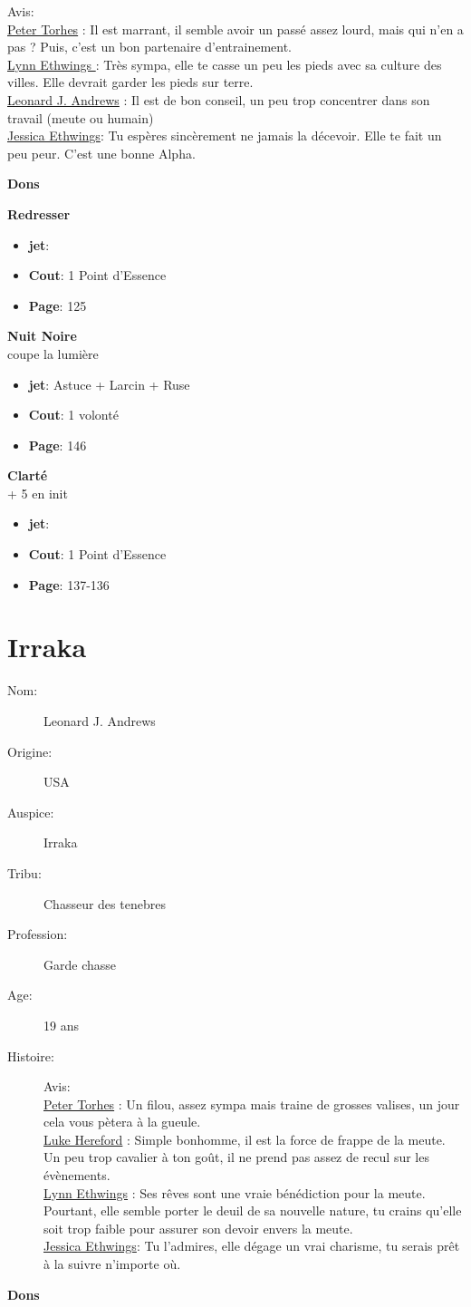 \documentclass[oneside,12pt]{book}
\newcommand\don[5]{
\textbf{#1} \\
#2
\begin{itemize}
\item{ \textbf{jet}: #3}
\item{ \textbf{Cout}: #4}
\item{ \textbf{Page}: #5}
\end{itemize}
\vspace{0.5cm}
}
\begin{document}
\begin{flushleft}
\begin{description}
{Avis:\\
\underline{Peter Torhes} : Il est marrant, il semble avoir un passé assez lourd, mais qui n'en a pas ? Puis, c'est un bon partenaire d'entrainement. \\
\underline{Lynn Ethwings }: Très sympa, elle te casse un peu les pieds avec sa culture des villes. Elle devrait garder les pieds sur terre.\\
\underline{Leonard J. Andrews} : Il est de bon conseil, un peu trop concentrer dans son travail (meute ou humain)\\
\underline{Jessica Ethwings}: Tu espères sincèrement ne jamais la décevoir. Elle te fait un peu peur. C'est une bonne Alpha.\\
}
\end{description}
\clearpage
\textbf{\large Dons} 
\vspace{0.5cm}


\don{Redresser}{}{}{1 Point d'Essence}{125}
\don{Nuit Noire}{coupe la lumière }{Astuce + Larcin + Ruse}{1 volonté}{146}
\don{Clarté}{+ 5 en init}{}{1 Point d'Essence}{137-136}

\clearpage
\section{Irraka}
\begin{description}
\item[Nom:]{Leonard J. Andrews}
\item[Origine:]{USA}
\item[Auspice:]{Irraka}
\item[Tribu:]{Chasseur des tenebres}
\item[Profession:]{Garde chasse}
\item[Age:]{19 ans}
\item[Histoire:]{
Avis:\\
\underline{Peter Torhes} : Un filou, assez sympa mais traine de grosses valises, un jour cela vous pètera à la gueule.\\
\underline{Luke Hereford} : Simple bonhomme, il est la force de frappe de la meute. Un peu trop cavalier à ton goût, il ne prend pas assez de recul sur les évènements.\\
\underline{Lynn Ethwings}  : Ses rêves sont une vraie bénédiction pour la meute. Pourtant, elle semble porter le deuil de sa nouvelle nature, tu crains qu'elle soit trop faible pour assurer son devoir envers la meute.\\
\underline{Jessica  Ethwings}: Tu l'admires, elle dégage un vrai charisme, tu serais prêt à la suivre n'importe où.\\
}
\end{description}
\clearpage
\textbf{\large Dons} 
\vspace{0.5cm}


\end{flushleft}
\end{document}
